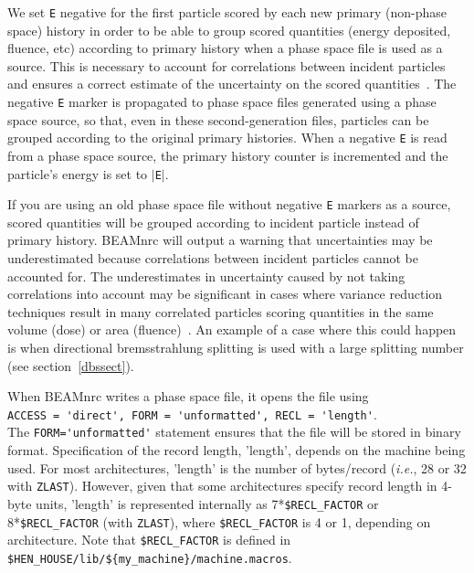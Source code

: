 \documentclass[12pt,twoside]{article}
\begin{document}
We set {\tt E} negative for the first particle scored by each new
primary (non-phase space) history in order to be able to group scored
quantities (energy deposited, fluence, etc) according to primary history
when a phase space file is used as a source.  This is necessary to
account for correlations between incident particles and ensures a
correct estimate of the uncertainty on the scored quantities~\cite{Wa02a}.
The negative {\tt E} marker is propagated to phase space files generated
using a phase space source, so that, even in these second-generation
files, particles can be grouped according to the original primary
histories.  When a negative {\tt E} is read from a phase space source,
the primary history counter is incremented and the particle's energy
is set to $|${\tt E}$|$.

If you are using an old phase space file without negative
{\tt E} markers as a source, scored quantities will be grouped according
to incident particle instead of primary history.  BEAMnrc will output
a warning that uncertainties may be underestimated because correlations
between incident particles cannot be accounted for. The underestimates in
uncertainty caused by not taking correlations into account may be significant in
cases where variance reduction techniques result in many correlated particles
scoring quantities in the same volume (dose) or area (fluence)~\cite{Wa02a}. An
example of a case where this could happen is when directional bremsstrahlung
splitting is used with a large splitting number (see section~\ref{dbssect}).

When BEAMnrc writes a phase space file, it opens the file using\\
\verb+ACCESS = 'direct', FORM = 'unformatted', RECL = 'length'+.\\
The \verb+FORM='unformatted'+ statement ensures that the file will be stored in
binary format.  Specification of the record length, 'length', depends on the
machine being used.  For most architectures, 'length' is the number of
bytes/record ({\em i.e.}, 28 or 32 with {\tt ZLAST}).  However, given that some
architectures specify record length in 4-byte units, 'length' is represented
internally as 7*\verb+$RECL_FACTOR+ or 8*\verb+$RECL_FACTOR+ (with {\tt ZLAST}),
where \verb+$RECL_FACTOR+ is 4 or 1, depending on architecture. Note that
\verb+$RECL_FACTOR+ is defined in\\
\verb+$HEN_HOUSE/lib/${my_machine}/machine.macros+.
\end{document}
